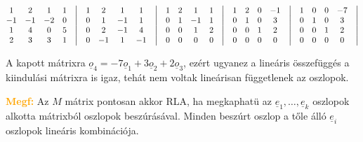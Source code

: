 \documentclass[../szamtud.tex]{subfiles}
\begin{document}
        $\begin{matrix}
            1 & 2 & 1 & 1 & \bigm| \\
            -1 & -1 & -2 & 0 & \bigm| \\
            1 & 4 & 0 & 5 & \bigm| \\
            2 & 3 & 3 & 1 & \bigm| 
        \end{matrix} 
        \begin{matrix}
            & 1 & 2 & 1 & 1 & \bigm| \\
            & 0 & 1 & -1 & 1 & \bigm| \\
            & 0 & 2 & -1 & 4 & \bigm| \\
            & 0 & -1 & 1 & -1 & \bigm| 
        \end{matrix} 
        \begin{matrix}
            & 1 & 2 & 1 & 1 & \bigm| \\
            & 0 & 1 & -1 & 1 & \bigm| \\
            & 0 & 0 & 1 & 2 & \bigm| \\
            & 0 & 0 & 0 & 0 & \bigm| 
        \end{matrix} 
        \begin{matrix}
            & 1 & 2 & 0 & -1 & \bigm| \\
            & 0 & 1 & 0 & 3 & \bigm| \\
            & 0 & 0 & 1 & 2 & \bigm| \\
            & 0 & 0 & 0 & 0 & \bigm| 
        \end{matrix} 
        \begin{matrix}
            & 1 & 0 & 0 & -7 & \bigm| \\
            & 0 & 1 & 0 & 3 & \bigm| \\
            & 0 & 0 & 1 & 2 & \bigm| \\
            & 0 & 0 & 0 & 0 & \bigm| 
        \end{matrix}$

        A kapott mátrixra $\underline{o}_4 = -7\underline{o}_1 + 3\underline{o}_2 + 2\underline{o}_3$, ezért ugyanez a lineáris összefüggés a kiindulási mátrixra is igaz, tehát nem voltak lineárisan függetlenek az oszlopok.

        \textcolor{orange}{\textbf{Megf:}} Az $M$ mátrix pontosan akkor RLA, ha megkaphatü az $\underline{e}_1, \dots, \underline{e}_k$ oszlopok alkotta mátrixból oszlopok beszúrásával. Minden beszúrt oszlop a tőle álló $\underline{e}_i$ oszlopok lineáris kombinációja.
\end{document}
